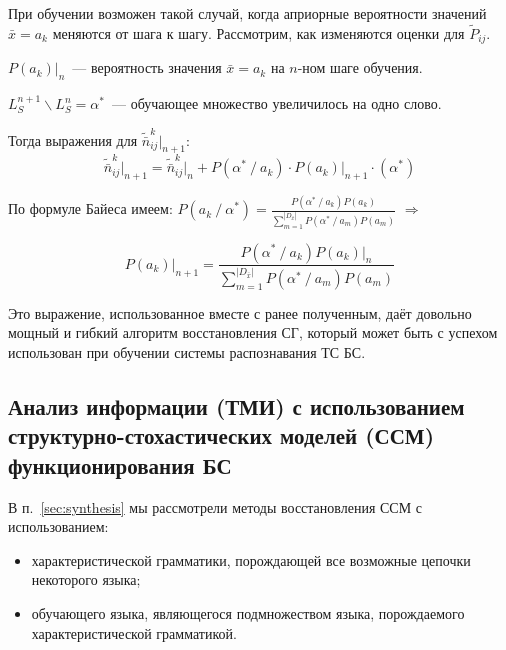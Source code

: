 При обучении возможен такой случай, когда априорные вероятности
значений $\bar{x} = a_k$ меняются от шага к шагу. Рассмотрим, как
изменяются оценки для $\tilde P_{ij}$.

$P(a_k) \Bigr|_n$~--- вероятность значения $\bar{x} = a_k$ на $n$-ном
шаге обучения.

$L_S^{n+1} \mathop{\backslash} L_S^n = \alpha^*$~--- обучающее
множество увеличилось на одно слово.

Тогда выражения для $\tilde{\bar{n}}_{ij}^k \Bigr|_{n+1}$:
\begin{equation*}
  \tilde{\bar{n}}_{ij}^k \Bigr|_{n+1} = \tilde{\bar{n}}_{ij}^k
  \Bigr|_n + P(\alpha^* \mathop{/} a_k) \cdot P(a_k)\Bigr|_{n+1} \cdot
  (\alpha^*)
\end{equation*}

По формуле Байеса имеем: $P(a_k \mathop{/} \alpha^*) =
\frac{P(\alpha^* \mathop{/} a_k) P(a_k)}{\sum_{m=1}^{|D_{\bar{x}}|}
  P(\alpha^* \mathop{/} a_m) P(a_m)}$ $\Rightarrow$

\begin{equation}
  P(a_k)\Bigr|_{n+1} = \frac{P(\alpha^* \mathop{/} a_k)
    P(a_k)\Bigr|_n}{\sum\limits_{m=1}^{|D_{\bar{x}}|} P(\alpha^* \mathop{/}
    a_m) P(a_m)}
\end{equation}

Это выражение, использованное вместе с ранее полученным, даёт довольно
мощный и гибкий алгоритм восстановления СГ, который может быть с
успехом использован при обучении системы распознавания ТС БС.


\subsection{Анализ информации (ТМИ) с использованием структурно-стохастических моделей (ССМ) функционирования БС}

В п.~\ref{sec:synthesis} мы рассмотрели методы восстановления ССМ с
использованием:
\begin{itemize}
\item характеристической грамматики, порождающей все возможные цепочки
  некоторого языка;
\item обучающего языка, являющегося подмножеством языка, порождаемого
  характеристической грамматикой.
\end{itemize}

